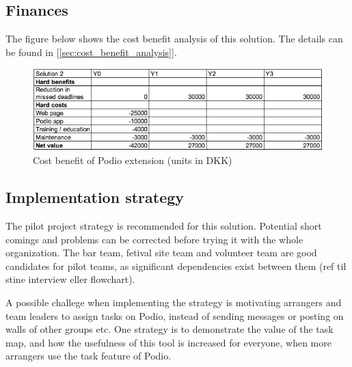 \subsection{Finances}
The figure below shows the cost benefit analysis of this solution. The details can be found in [\ref{sec:cost_benefit_analysis}].
\begin{figure}[h!]
  \centering
\includegraphics[scale=0.5]{Pictures/cost-benefit2.png}
    \caption{Cost benefit of Podio extension (units in DKK)}
\end{figure}

\subsection{Implementation strategy}
The pilot project strategy is recommended for this solution. Potential short comings and problems can be corrected before trying it with the whole organization. The bar team, fetival site team and volunteer team are good candidates for pilot teams, as significant dependencies exist between them (ref til stine interview eller flowchart).

A possible challege when implementing the strategy is motivating arrangers and team leaders to assign tasks on Podio, instead of sending messages or posting on walls of other groups etc. One strategy is to demonstrate the value of the task map, and how the usefulness of this tool is increased for everyone, when more arrangers use the task feature of Podio.

